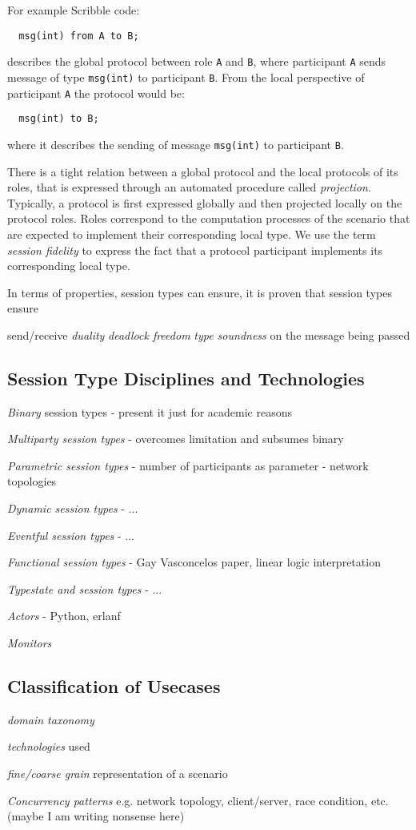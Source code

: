 For example Scribble code:
%
\begin{lstlisting}
  msg(int) from A to B;
\end{lstlisting}
%
describes the global protocol between role \lstinline|A| and \lstinline|B|,
where participant \lstinline|A| sends message of type \lstinline|msg(int)|
to participant \lstinline|B|. From the local perspective of participant
\lstinline|A| the protocol would be:
%
\begin{lstlisting}
  msg(int) to B;
\end{lstlisting}
%
where it describes the sending of message \lstinline|msg(int)|
to participant \lstinline|B|.

There is a tight relation between a global protocol and the
local protocols of its roles, that is expressed
through an automated procedure called {\em projection}.
Typically, a protocol is first expressed globally and then
projected locally on the protocol roles. Roles
correspond to the computation processes of the scenario
that are expected to implement their corresponding local type.
We use the term {\em session fidelity} to express the fact
that a protocol participant implements its corresponding local type.

In terms of properties, session types can ensure, it is proven
that session types ensure

send/receive {\em duality}
{\em deadlock freedom}
{\em type soundness} on the message being passed


\subsection{Session Type Disciplines and Technologies}


{\em Binary} session types - present it just for academic reasons

{\em Multiparty session types} - overcomes limitation and subsumes binary

{\em Parametric session types} - number of participants as parameter - network topologies

{\em Dynamic session types} - ...

{\em Eventful session types} - ...

{\em Functional session types} - Gay Vasconcelos paper, linear logic interpretation

{\em Typestate and session types} - ...

{\em Actors} - Python, erlanf

{\em Monitors}

\subsection{Classification of Usecases}

{\em domain taxonomy}

{\em technologies} used

{\em  fine/coarse grain} representation of a scenario

{\em Concurrency patterns} e.g. network topology, client/server, race condition, etc. (maybe I am writing nonsense here)

